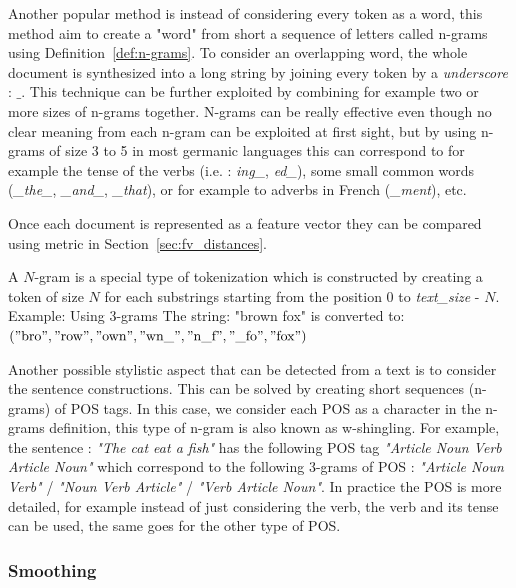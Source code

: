 Another popular method is instead of considering every token as a word, this method aim to create a "word" from short a sequence of letters called n-grams using Definition~\ref{def:n-grams}.
To consider an overlapping word, the whole document is synthesized into a long string by joining every token by a \textit{underscore} : $\_$.
This technique can be further exploited by combining for example two or more sizes of n-grams together.
N-grams can be really effective even though no clear meaning from each n-gram can be exploited at first sight, but by using n-grams of size 3 to 5 in most germanic languages this can correspond to for example the tense of the verbs (i.e. : \textit{ing\_}, \textit{ed\_}), some small common words (\textit{\_the\_}, \textit{\_and\_}, \textit{\_that}), or for example to adverbs in French (\textit{\_ment}), etc.

Once each document is represented as a feature vector they can be compared using metric in Section~\ref{sec:fv_distances}.

\begin{definition}[$n$-grams]
  \label{def:n-grams}
  A $N$-gram is a special type of tokenization which is constructed by creating a token of size $N$ for each substrings starting from the position $0$ to \textit{text\_size} - $N$.
  Example: Using 3-grams The string: "brown fox" is converted to: \\
  $("\text{bro}", "\text{row}", "\text{own}", "\text{wn\_}", "\text{n\_f}", "\text{\_fo}", "\text{fox}")$
\end{definition}

Another possible stylistic aspect that can be detected from a text is to consider the sentence constructions.
This can be solved by creating short sequences (n-grams) of POS tags.
In this case, we consider each POS as a character in the n-grams definition, this type of n-gram is also known as w-shingling.
For example, the sentence : \textit{"The cat eat a fish"} has the following POS tag \textit{"Article Noun Verb Article Noun"} which correspond to the following 3-grams of POS : \textit{"Article Noun Verb"} / \textit{"Noun Verb Article"} / \textit{"Verb Article Noun"}.
In practice the POS is more detailed, for example instead of just considering the verb, the verb and its tense can be used, the same goes for the other type of POS.

\subsubsection{Smoothing}

